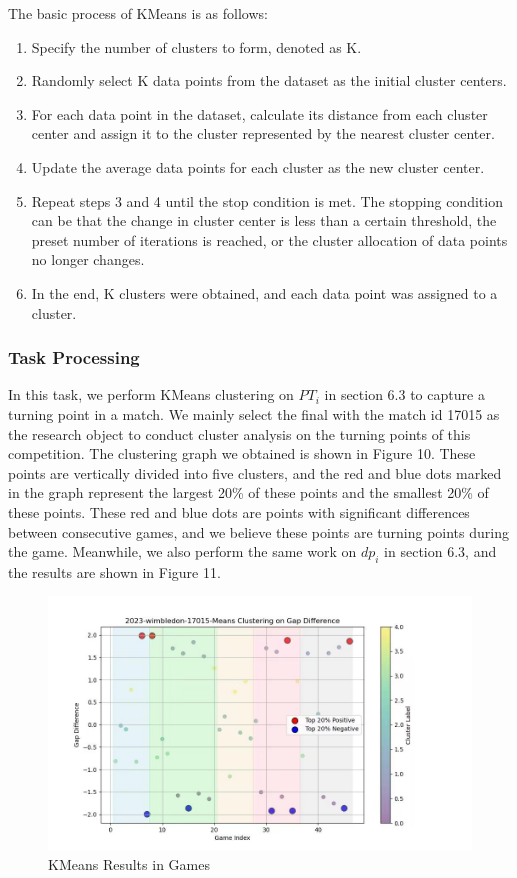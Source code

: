 \documentclass{mcmthesis}
\begin{document}
The basic process of KMeans is as follows:
\begin{enumerate}
  \item Specify the number of clusters to form, denoted as K.
  \item Randomly select K data points from the dataset as the initial cluster centers.
  \item For each data point in the dataset, calculate its distance from each cluster center and assign it to the cluster represented by the nearest cluster center.
  \item Update the average data points for each cluster as the new cluster center.
  \item Repeat steps 3 and 4 until the stop condition is met. The stopping condition can be that the change in cluster center is less than a certain threshold, the preset number of iterations is reached, or the cluster allocation of data points no longer changes.
  \item In the end, K clusters were obtained, and each data point was assigned to a cluster.
\end{enumerate}

\subsubsection{Task Processing}
In this task, we perform KMeans clustering on $PT_i$ in section 6.3 to capture a turning point in a match. We mainly select the final with the match id 17015 as the research object to conduct cluster analysis on the turning points of this competition. The clustering graph we obtained is shown in Figure 10. These points are vertically divided into five clusters, and the red and blue dots marked in the graph represent the largest 20\% of these points and the smallest 20\% of these points. These red and blue dots are points with significant differences between consecutive games, and we believe these points are turning points during the game. Meanwhile, we also perform the same work on $dp_i$ in section 6.3, and the results are shown in Figure 11. 

\begin{figure}[h]
\centering
\includegraphics[width=12cm]{figures/KMeans.jpg}
\caption{KMeans Results in Games} \label{fig:aa}
\end{figure}
\end{document}
